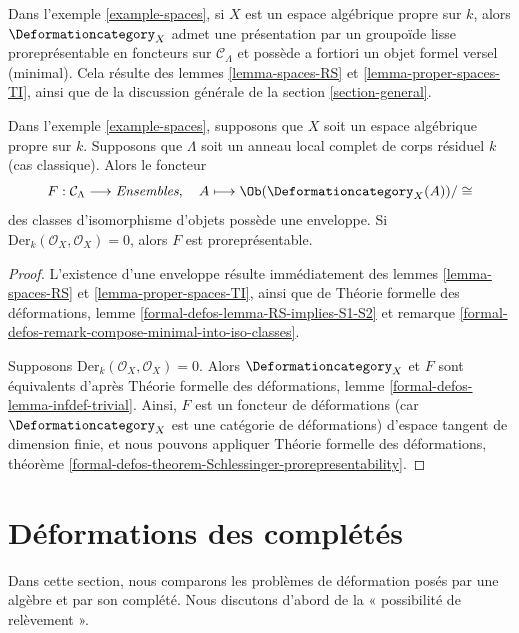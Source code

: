 \noindent
Dans l'exemple \ref{example-spaces}, si $X$ est un espace algébrique propre sur $k$,
alors $\Deformationcategory_X$
admet une présentation par un groupoïde lisse proreprésentable en foncteurs
sur $\mathcal{C}_\Lambda$
et possède a fortiori un objet formel versel (minimal). Cela résulte
des lemmes \ref{lemma-spaces-RS} et
\ref{lemma-proper-spaces-TI},
ainsi que de la discussion générale de la section \ref{section-general}.

\begin{lemma}
\label{lemma-spaces-hull}
Dans l'exemple \ref{example-spaces}, supposons que $X$ soit un espace algébrique propre sur $k$.
Supposons que $\Lambda$ soit un anneau local complet de corps résiduel $k$
(cas classique). Alors le foncteur
$$
F : \mathcal{C}_\Lambda \longrightarrow \textit{Ensembles},\quad
A \longmapsto \Ob(\Deformationcategory_X(A))/\cong
$$
des classes d'isomorphisme d'objets possède une enveloppe. Si
$\text{Der}_k(\mathcal{O}_X, \mathcal{O}_X) = 0$, alors
$F$ est proreprésentable.
\end{lemma}

\begin{proof}
L'existence d'une enveloppe résulte immédiatement des
lemmes \ref{lemma-spaces-RS} et \ref{lemma-proper-spaces-TI}, ainsi que de
Théorie formelle des déformations, lemme \ref{formal-defos-lemma-RS-implies-S1-S2}
et remarque \ref{formal-defos-remark-compose-minimal-into-iso-classes}.

\medskip\noindent
Supposons $\text{Der}_k(\mathcal{O}_X, \mathcal{O}_X) = 0$. Alors
$\Deformationcategory_X$ et $F$ sont équivalents d'après
Théorie formelle des déformations, lemme \ref{formal-defos-lemma-infdef-trivial}.
Ainsi, $F$ est un foncteur de déformations (car $\Deformationcategory_X$ est une
catégorie de déformations) d'espace tangent de dimension finie, et nous pouvons appliquer
Théorie formelle des déformations, théorème
\ref{formal-defos-theorem-Schlessinger-prorepresentability}.
\end{proof}





\section{Déformations des complétés}
\label{section-compare}

\noindent
Dans cette section, nous comparons les problèmes de déformation posés
par une algèbre et par son complété.
Nous discutons d'abord de la « possibilité de relèvement ».

